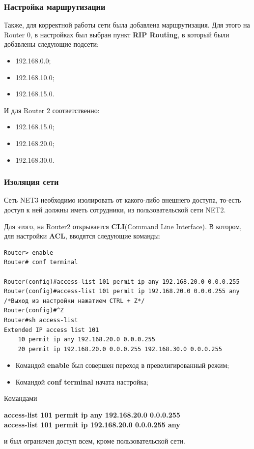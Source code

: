 \subsubsection{Настройка маршрутизации}
Также, для корректной работы сети была добавлена маршрутизация. Для этого на Router 0, в настройках был выбран пункт \textbf{RIP Routing}, в который были добавлены следующие подсети:
\begin{itemize}
\item 192.168.0.0;
\item 192.168.10.0;
\item 192.168.15.0.
\end{itemize}
И для Router 2 соответственно:
\begin{itemize}
\item 192.168.15.0;
\item 192.168.20.0;
\item 192.168.30.0.
\end{itemize}
\subsubsection{Изоляция сети}
Сеть NET3 необходимо изолировать от какого-либо внешнего доступа, то-есть доступ к ней должны иметь сотрудники, из пользовательской сети NET2.

Для этого, на Router2 открывается \textbf{CLI}(Command Line Interface). В котором, для настройки \textbf{ACL}, вводятся следующие команды:
\begin{lstlisting}[language={}, caption={index.html}]
Router> enable
Router# conf terminal

Router(config)#access-list 101 permit ip any 192.168.20.0 0.0.0.255
Router(config)#access-list 101 permit ip 192.168.20.0 0.0.0.255 any
/*Выход из настройки нажатием CTRL + Z*/
Router(config)#^Z
Router#sh access-list
Extended IP access list 101
    10 permit ip any 192.168.20.0 0.0.0.255
    20 permit ip 192.168.20.0 0.0.0.255 192.168.30.0 0.0.0.255
\end{lstlisting}
\begin{itemize}
\item Командой \textbf{enable} был совершен переход в превелигированный режим;
\item Командой \textbf{conf terminal} начата настройка;
\end{itemize}
Командами
\begin{center}
\textbf{access-list 101 permit ip any 192.168.20.0 0.0.0.255}\\
\textbf{access-list 101 permit ip 192.168.20.0 0.0.0.255 any}
\end{center}
и был ограничен доступ всем, кроме пользовательской сети.

